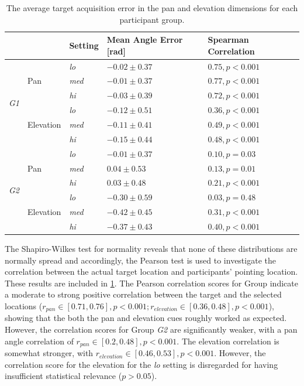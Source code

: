 \documentclass{article}
\begin{document}
\begin{table}
  \centering
  \caption{The average target acquisition error in the pan and elevation dimensions for each participant group. }\label{tab:target-results}
  \begin{tabular}{p{0.5cm}p{0.7cm}p{1cm}p{2cm}p{2.25cm}}
    \toprule
    &           & Setting      & Mean Angle Error [rad] & Spearman Correlation \\ \midrule
    \multirow{6}{*}{\textit{G1}}
    &           & \textit{lo}  & $-0.02\pm0.37$ & $0.75, p < 0.001$ \\
    & Pan       & \textit{med} & $-0.01\pm0.37$ & $0.77, p < 0.001$ \\
    &           & \textit{hi}  & $-0.03\pm0.39$ & $0.72, p < 0.001$ \\ \cline{3-5}
    &           & \textit{lo}  & $-0.12\pm0.51$ & $0.36, p < 0.001$ \\
    & Elevation & \textit{med} & $-0.11\pm0.41$ & $0.49, p < 0.001$ \\
    &           & \textit{hi}  & $-0.15\pm0.44$ & $0.48, p < 0.001$ \\ \midrule
    \multirow{6}{*}{\textit{G2}}
    &           & \textit{lo}  & $-0.01\pm0.37$ & $0.10, p = 0.03$  \\
    & Pan       & \textit{med} & $ 0.04\pm0.53$ & $0.13, p = 0.01$  \\
    &           & \textit{hi}  & $ 0.03\pm0.48$ & $0.21, p < 0.001$ \\\cline{3-5}
    &           & \textit{lo}  & $-0.30\pm0.59$ & $0.03, p = 0.48$  \\
    & Elevation & \textit{med} & $-0.42\pm0.45$ & $0.31, p < 0.001$ \\
    &           & \textit{hi}  & $-0.37\pm0.43$ & $0.40, p < 0.001$ \\ 
    \bottomrule
  \end{tabular}
\end{table}

The Shapiro-Wilkes test for normality reveals that none of these distributions are normally spread and accordingly, the Pearson test is used to investigate the correlation between the actual target location and participants' pointing location.
These results are included in \cref{tab:target-results}.
The Pearson correlation scores for Group  indicate a moderate to strong positive correlation between the target and the selected locations ($r_{pan} \in [0.71, 0.76], p < 0.001; r_{elevation} \in [0.36, 0.48], p < 0.001$), showing that the both the pan and elevation cues roughly worked as expected.
However, the correlation scores for Group \textit{G2} are significantly weaker, with a pan angle correlation of $r_{pan} \in [0.2, 0.48], p < 0.001$.
The elevation correlation is somewhat stronger, with $r_{elevation} \in [0.46, 0.53], p < 0.001$.
However, the correlation score for the elevation for the \textit{lo} setting is disregarded for having insufficient statistical relevance ($p > 0.05$). 
\end{document}
